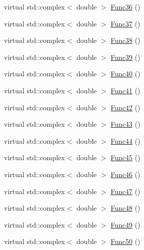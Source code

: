 \begin{DoxyCompactItemize}
\item 
virtual std\-::complex$<$ double $>$ \hyperlink{classosea_1_1ofreq_1_1_equationof_motion_a51a0d7c4447833b5d26cf3624623bd33}{Func36} ()
\item 
virtual std\-::complex$<$ double $>$ \hyperlink{classosea_1_1ofreq_1_1_equationof_motion_a80f3f61eaded9b475fbb47aaf335183f}{Func37} ()
\item 
virtual std\-::complex$<$ double $>$ \hyperlink{classosea_1_1ofreq_1_1_equationof_motion_a01727a601ff0281f16591ef4d1b5bbf0}{Func38} ()
\item 
virtual std\-::complex$<$ double $>$ \hyperlink{classosea_1_1ofreq_1_1_equationof_motion_a5e986c0952ec3c25426bba62737633f1}{Func39} ()
\item 
virtual std\-::complex$<$ double $>$ \hyperlink{classosea_1_1ofreq_1_1_equationof_motion_aeefb90327b72c61c09a22d2bed6ebd60}{Func40} ()
\item 
virtual std\-::complex$<$ double $>$ \hyperlink{classosea_1_1ofreq_1_1_equationof_motion_af6ac5c3c8cfd7ae351693bb349d6f28a}{Func41} ()
\item 
virtual std\-::complex$<$ double $>$ \hyperlink{classosea_1_1ofreq_1_1_equationof_motion_a8a7b456c14cbbf5a284bc6438eedaec9}{Func42} ()
\item 
virtual std\-::complex$<$ double $>$ \hyperlink{classosea_1_1ofreq_1_1_equationof_motion_a9b70e7f90d34a774a4a19b77b759a7d5}{Func43} ()
\item 
virtual std\-::complex$<$ double $>$ \hyperlink{classosea_1_1ofreq_1_1_equationof_motion_aa85ed6fe8cee4a23ed82947b32aa8afd}{Func44} ()
\item 
virtual std\-::complex$<$ double $>$ \hyperlink{classosea_1_1ofreq_1_1_equationof_motion_af447cb3b12a7dd0667a2e1ebf95b9012}{Func45} ()
\item 
virtual std\-::complex$<$ double $>$ \hyperlink{classosea_1_1ofreq_1_1_equationof_motion_ae26b7d1ec3c7ac4d8e16188e46cc3350}{Func46} ()
\item 
virtual std\-::complex$<$ double $>$ \hyperlink{classosea_1_1ofreq_1_1_equationof_motion_a63049815de6897a3e981939434e2435c}{Func47} ()
\item 
virtual std\-::complex$<$ double $>$ \hyperlink{classosea_1_1ofreq_1_1_equationof_motion_ae6eb5b8e68ea3ea44cecc4a528e61d1c}{Func48} ()
\item 
virtual std\-::complex$<$ double $>$ \hyperlink{classosea_1_1ofreq_1_1_equationof_motion_af5fc7d0ef4f09f546779bbab205603e8}{Func49} ()
\item 
virtual std\-::complex$<$ double $>$ \hyperlink{classosea_1_1ofreq_1_1_equationof_motion_acb2bacacd96cf28600678e1a5a0ae397}{Func50} ()
\end{DoxyCompactItemize}
